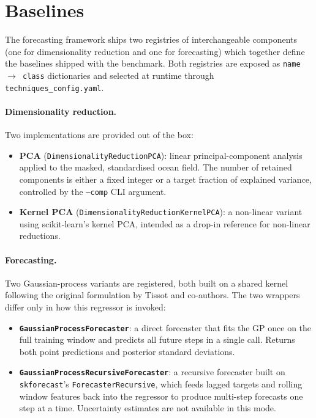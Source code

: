 \documentclass{article}
\begin{document}
\section{Baselines}
\label{sec:baselines}

The forecasting framework ships two registries of interchangeable
components (one for dimensionality reduction and one for forecasting)
which together define the baselines shipped with the benchmark. Both
registries are exposed as \texttt{name $\rightarrow$ class} dictionaries
and selected at runtime through \texttt{techniques\_config.yaml}.

\paragraph{Dimensionality reduction.}
Two implementations are provided out of the box:

\begin{itemize}
  \item \textbf{PCA} (\texttt{DimensionalityReductionPCA}): linear
    principal-component analysis applied to the masked, standardised
    ocean field. The number of retained components is either a fixed
    integer or a target fraction of explained variance, controlled by
    the \texttt{--comp} CLI argument.
  \item \textbf{Kernel PCA} (\texttt{DimensionalityReductionKernelPCA}):
    a non-linear variant using scikit-learn's kernel PCA, intended
    as a drop-in reference for non-linear reductions.
\end{itemize}

\paragraph{Forecasting.}
Two Gaussian-process variants are registered, both built on a shared
kernel following the original formulation by Tissot and co-authors.
The two wrappers differ only in how this regressor is invoked:

\begin{itemize}
  \item \textbf{\texttt{GaussianProcessForecaster}}: a direct
    forecaster that fits the GP once on the full training window and
    predicts all future steps in a single call. Returns both point
    predictions and posterior standard deviations.
  \item \textbf{\texttt{GaussianProcessRecursiveForecaster}}: a
    recursive forecaster built on \texttt{skforecast}'s
    \texttt{ForecasterRecursive}, which feeds lagged targets and rolling
    window features back into the regressor to produce multi-step
    forecasts one step at a time. Uncertainty estimates are not
    available in this mode.
\end{itemize}
\end{document}
